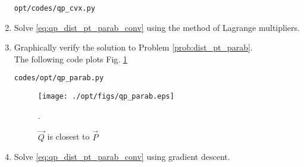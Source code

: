 \begin{enumerate}[label=\thechapter.\arabic*.,ref=\thechapter.\theenumi]
\begin{lstlisting}
opt/codes/qp_cvx.py
\end{lstlisting}

\item Solve \eqref{eq:qp_dist_pt_parab_conv} using the method of Lagrange multipliers.
\item Graphically verify the solution to Problem \ref{prob:dist_pt_parab}. 
\\
\solution 
The following code plots Fig. \ref{fig:qp_parab}
%	
\begin{lstlisting}
codes/opt/qp_parab.py
\end{lstlisting}

%
\begin{figure}[!ht]
\centering
\texttt{[image: ./opt/figs/qp\_parab.eps]}
\caption{ $\vec{Q}$ is closest to $\vec{P}$}.
\label{fig:qp_parab}
\end{figure}
%
%
%	
\item Solve \eqref{eq:qp_dist_pt_parab_conv} using gradient descent.
%
\end{enumerate}
